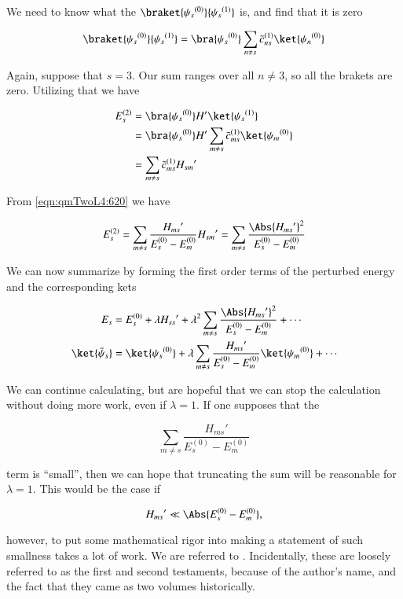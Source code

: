 We need to know what the $\braket{{\psi_s}^{(0)}}{{\psi_s}^{(1)}}$ is, and find that it is zero

\begin{equation}\label{eqn:qmTwoL4:660}
\braket{{\psi_s}^{(0)}}{{\psi_s}^{(1)}}
=
\bra{{\psi_s}^{(0)}}
\sum_{n \ne s} {\bar{c}_{ns}}^{(1)} \ket{{\psi_n}^{(0)}}
\end{equation}

Again, suppose that $s = 3$.  Our sum ranges over all $n \ne 3$, so all the brakets are zero.  Utilizing that we have

\begin{align*}
E_s^{(2)} 
&=
\bra{{\psi_s}^{(0)}} H' \ket{{\psi_s}^{(1)}}  \\
&=
\bra{{\psi_s}^{(0)}} H' \sum_{m \ne s} {\bar{c}_{ms}}^{(1)} \ket{{\psi_m}^{(0)}} \\
&=
\sum_{m \ne s} {\bar{c}_{ms}}^{(1)} {H_{sm}}'
\end{align*}

From \ref{eqn:qmTwoL4:620} we have

\begin{equation}\label{eqn:qmTwoL4:700}
E_s^{(2)} 
=
\sum_{m \ne s} 
\frac{{H_{ms}}' }
{ E_s^{(0)} - E_m^{(0)} }
{H_{sm}}'
=
\sum_{m \ne s} 
\frac{\Abs{{H_{ms}}'}^2 }
{ E_s^{(0)} - E_m^{(0)} }
\end{equation}

We can now summarize by forming the first order terms of the perturbed energy and the corresponding kets

\begin{align}\label{eqn:qmTwoL4:720}
E_s &= E_s^{(0)} + \lambda {H_{ss}}' + \lambda^2 
\sum_{m \ne s} 
\frac{\Abs{{H_{ms}}'}^2 }
{ E_s^{(0)} - E_m^{(0)} } 
+ \cdots
\\
\ket{\bar{\psi}_s} &= \ket{{\psi_s}^{(0)}} + \lambda
\sum_{m \ne s} 
\frac{{H_{ms}}'}
{ E_s^{(0)} - E_m^{(0)} } \ket{{\psi_m}^{(0)}}
+ \cdots
\end{align}

We can continue calculating, but are hopeful that we can stop the calculation without doing more work, even if $\lambda = 1$.  If one supposes that the 

\begin{equation}\label{eqn:qmTwoL4:740}
\sum_{m \ne s} 
\frac{{H_{ms}}'}
{ E_s^{(0)} - E_m^{(0)} } 
\end{equation}

term is ``small'', then we can hope that truncating the sum will be reasonable for $\lambda = 1$.  This would be the case if

\begin{equation}\label{eqn:qmTwoL4:760}
{H_{ms}}' \ll \Abs{ E_s^{(0)} - E_m^{(0)} },
\end{equation}

however, to put some mathematical rigor into making a statement of such smallness takes a lot of work.  We are referred to \cite{messiah1999quantum}.  Incidentally, these are loosely referred to as the first and second testaments, because of the author's name, and the fact that they came as two volumes historically.

\EndArticle
